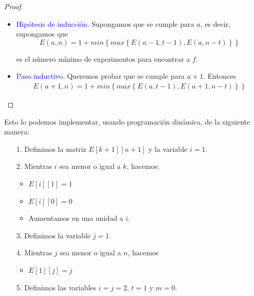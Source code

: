 \documentclass[letterpaper,11pt]{article}
\begin{document}
\begin{enumerate}
\begin{proof}
\begin{itemize}
            \item \textcolor{blue}{Hipótesis de inducción}. Supongamos que se 
            cumple para $a$, es decir, supongamos que 
            \begin{equation*}
                E(a, n) =
                1 + min\left\{max\left\{E(a-1, t-1), E(a, n-t)\right\}\right\}
            \end{equation*}

            es el número mínimo de experimentos para encontrar a $f$.

            \item \textcolor{blue}{Paso inductivo}. Queremos probar que se 
            cumple para $a + 1$. Entonces 
            \begin{align*}
                E(a+1, n) = 
                1 + min\left\{max\left\{E(a, t-1), E(a+1, n-t)\right\}\right\}
            \end{align*}


        \end{itemize}
    \end{proof}

    Esto lo podemos implementar, usando programación dinámica, de la siguiente 
    manera: 
    \begin{itemize}
        \item[1.] Definimos la matriz $E[k+1][n+1]$ y la variable $i=1$.

        \item[2.] Mientras $i$ sea menor o igual a $k$, hacemos:
        \begin{itemize}
            \item $E[i][1] = 1$
            \item $E[i][0] = 0$
            \item Aumentamos en una unidad a $i$.
        \end{itemize}

        \item[3.] Definimos la variable $j = 1$.
        
        \item[4.] Mientras $j$ sea menor o igual a $n$, hacemos 
        \begin{itemize}
            \item $E[1][j] = j$
        \end{itemize}

        \item[5.] Definimos las variables $i = j = 2$, $t = 1$ y $m = 0$.


\end{itemize}
\end{enumerate}
\end{document}
